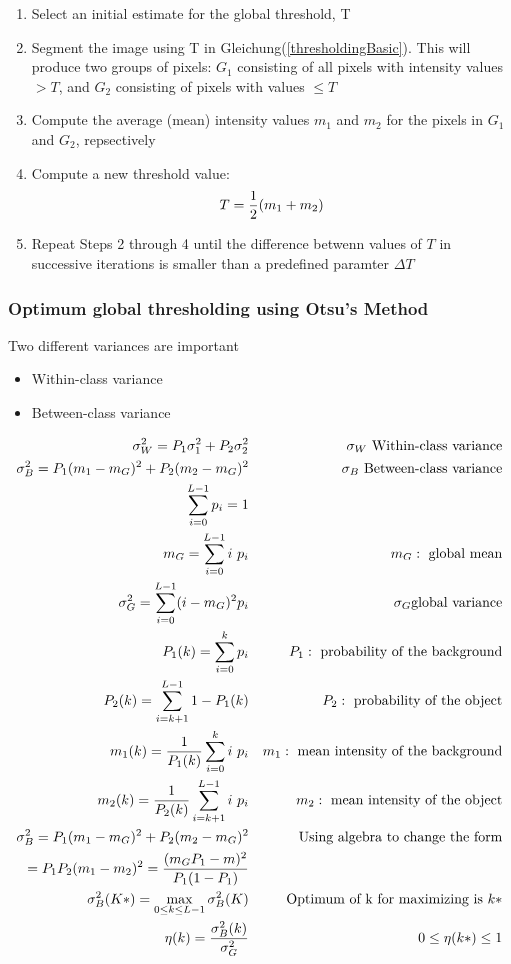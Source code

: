 \begin{enumerate}
\item Select an initial estimate for the global threshold, T
\item Segment the image using T in Gleichung(\ref{thresholdingBasic}). This will produce two groups of pixels: $G_1$ consisting of all pixels with intensity values $> T$, and $G_2$ consisting of pixels with values $\leq T$
\item Compute the average (mean) intensity values $m_1$ and $m_2$ for the pixels in $G_1$ and $G_2$, repsectively
\item Compute a new threshold value: \begin{equation}
T=\frac{1}{2}(m_1+m_2)\notag
\end{equation} 
\item Repeat Steps 2 through 4 until the difference betwenn values of $T$ in successive iterations is smaller than a predefined paramter $\Delta T$
\end{enumerate}
\subsubsection{Optimum global thresholding using Otsu’s Method}

Two different variances are important
\begin{itemize}
\item Within-class variance
\item Between-class variance
\end{itemize}
\begin{eqnarray}
\sigma_W^2 = P_1\sigma_1^2+P_2\sigma_2^2 
& & \sigma_W \text{ Within-class variance} \notag \\
\sigma_B^2 = P_1(m_1-m_G)^2+P_2(m_2-m_G)^2
& & \sigma_B \text{ Between-class variance} \notag \\
\sum_{i=0}^{L-1} p_i = 1 
& & \notag \\
m_G=\sum_{i=0}^{L-1} i \ p_i 
& & m_G: \text{ global mean}  \notag \\
\sigma_G^2 = \sum_{i=0}^{L-1} (i-m_G)^2 p_i
& & \sigma_G \text{global variance} \notag \\
P_1(k) =\sum_{i=0}^{k} p_i
& &  P_1: \text{ probability of the background}   \notag \\
P_2(k)=\sum_{i=k+1}^{L-1}1-P_1(k)
& & P_2: \text{ probability of the object} \notag \\
m_1(k)=\frac{1}{P_1(k)}\sum_{i=0}^{k} i \ p_i
& &  m_1: \text{ mean intensity of the background}  \notag \\
m_2(k)=\frac{1}{P_2(k)}\sum_{i=k+1}^{L-1} i \ p_i 
& &  m_2: \text{ mean intensity of the object}  \notag \\
\sigma_B^2 = P_1(m_1-m_G)^2+P_2(m_2-m_G)^2 & &  \text{Using algebra to change the form} \notag \\
=P_1 P_2 (m_1-m_2)^2 = \frac{(m_G P_1 - m)^2}{P_1(1-P_1)} & & \notag \\
\sigma_B^2(K*)=\max\limits_{0\leq k \leq L-1} \sigma_B^2(K)
& & \text{Optimum of k for maximizing is } k* \notag \\
\eta(k)=\frac{\sigma_B^2(k)}{\sigma_G^2}
& & 0 \leq  \eta(k*)\leq 1 \notag
\end{eqnarray}

